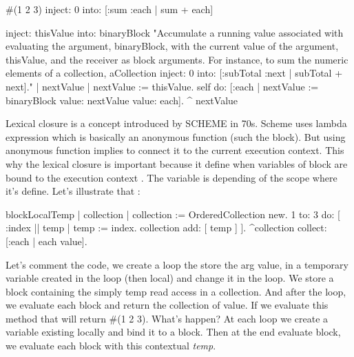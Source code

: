 \documentclass[a4paper,10pt,twoside]{book}
\begin{document}
\begin{code}{}
#(1 2 3) inject: 0 into: [:sum :each | sum + each]
\end{code}

\begin{code}{}
inject: thisValue into: binaryBlock
	"Accumulate a running value associated with evaluating the argument,
	binaryBlock, with the current value of the argument, thisValue, and the
	receiver as block arguments. For instance, to sum the numeric elements of a
	collection, aCollection inject: 0 into: [:subTotal :next | subTotal + next]."
	| nextValue |
	nextValue := thisValue.
	self do: [:each | nextValue := binaryBlock value: nextValue value: each]. 	^ nextValue
\end{code}



Lexical closure is a concept introduced by SCHEME in 70s. Scheme uses lambda expression which is basically an anonymous function (such the block). But using anonymous function implies to connect it to the current execution context. This  why the lexical closure is important because it define when variables of block are bound to the execution context . The variable is depending of the scope where it's  define. Let's illustrate that :

\begin{code}{}
blockLocalTemp
	| collection |
		collection := OrderedCollection new.
		1 to: 3 do: [ :index || temp |
			temp := index.
			collection add: [ temp ] ].
		^collection collect: [:each | each value].
\end{code}

Let's comment the code, we create a loop the store the arg value, in a temporary variable created in the loop (then local) and change it in the loop. We store a block containing the simply temp read access in a collection. And after the loop, we evaluate each block and return the collection of value.
If we evaluate this method that will return \#(1 2 3). What's happen? At each loop we create a variable existing locally and bind it to a block. Then at the end evaluate block, we evaluate each block with this contextual \emph{temp}.
\end{document}

